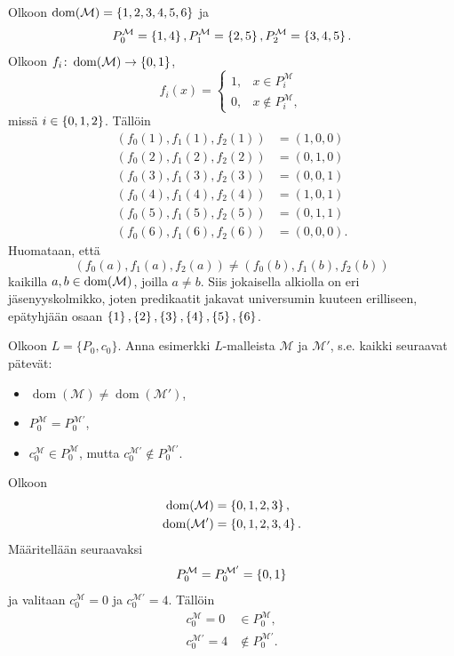 \documentclass[11pt,a4paper]{amsart}
\begin{document}
\begin{solution}
  Olkoon \(\operatorname{dom}(\mathcal{M}) = \left\lbrace1, 2, 3, 4, 5, 6\right\rbrace\) ja
  \[
    P_0^{\mathcal{M}} = \left\lbrace1, 4\right\rbrace, P_1^{\mathcal{M}} = \left\lbrace2, 5\right\rbrace,
    P_2^{\mathcal{M}} = \left\lbrace3, 4, 5\right\rbrace.
  \]
  Olkoon \(f_i \colon \operatorname{dom}(\mathcal{M}) \to \left\lbrace0, 1\right\rbrace\),
  \[
    f_i(x) =
    \begin{cases}
      1, & x \in P_i^{\mathcal{M}} \\
      0, & x \notin P_i^{\mathcal{M}},
    \end{cases}
  \]
  missä \(i \in \left\lbrace0, 1, 2\right\rbrace\). Tällöin
  \[
    \begin{aligned}
      (f_0(1), f_1(1), f_2(1)) &= (1, 0, 0) \\
      (f_0(2), f_1(2), f_2(2)) &= (0, 1, 0) \\
      (f_0(3), f_1(3), f_2(3)) &= (0, 0, 1) \\
      (f_0(4), f_1(4), f_2(4)) &= (1, 0, 1) \\
      (f_0(5), f_1(5), f_2(5)) &= (0, 1, 1) \\
      (f_0(6), f_1(6), f_2(6)) &= (0, 0, 0).
    \end{aligned}
  \]
  Huomataan, että
  \[
    (f_0(a), f_1(a), f_2(a)) \neq (f_0(b), f_1(b), f_2(b))
  \]
  kaikilla \(a, b \in \operatorname{dom}(\mathcal{M})\), joilla \(a \ne b\).
  Siis jokaisella alkiolla on eri jäsenyyskolmikko, joten predikaatit jakavat
  universumin kuuteen erilliseen, epätyhjään osaan
  \(\left\lbrace1\right\rbrace, \left\lbrace2\right\rbrace, \left\lbrace3\right\rbrace, \left\lbrace4\right\rbrace, \left\lbrace5\right\rbrace, \left\lbrace6\right\rbrace\).
\end{solution}

\begin{exercise}
  Olkoon \(L = \{P_0, c_0\}\). Anna esimerkki \(L\)-malleista \(\mathcal M\)
  ja \(\mathcal M'\), s.e. kaikki seuraavat pätevät:
  \begin{itemize}
    \item \(\operatorname{dom}(\mathcal M) \ne
      \operatorname{dom}(\mathcal M')\),
    \item \(P_0^{\mathcal M} = P_0^{\mathcal M'}\),
    \item \(c_0^{\mathcal M} \in P_0^{\mathcal M}\), mutta
      \(c_0^{\mathcal M'} \notin P_0^{\mathcal M'}\).
  \end{itemize}
\end{exercise}

\begin{solution}
  Olkoon
  \[
    \begin{aligned}
      \operatorname{dom}(\mathcal{M}) &= \left\lbrace0, 1, 2, 3\right\rbrace, \\
      \operatorname{dom}(\mathcal{M}') &= \left\lbrace0, 1, 2, 3, 4\right\rbrace.
    \end{aligned}
  \]
  Määritellään seuraavaksi
  \[
    P_0^{\mathcal{M}} = P_0^{\mathcal{M}'} = \left\lbrace0, 1\right\rbrace
  \]
  ja valitaan \(c_0^{\mathcal{M}} = 0\) ja \(c_0^{\mathcal{M}'} = 4\).
  Tällöin
  \[
    \begin{aligned}
      c_0^{\mathcal{M}} = 0 &\in P_0^{\mathcal{M}}, \\
      c_0^{\mathcal{M}'} = 4 &\notin P_0^{\mathcal{M}'}.
    \end{aligned}
  \]
\end{solution}
\end{document}
